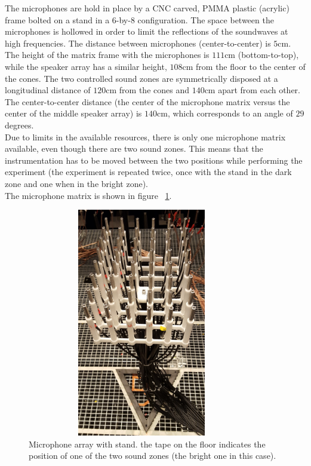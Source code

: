 The microphones are hold in place by a CNC carved, PMMA plastic (acrylic) frame bolted on a stand in a 6-by-8 configuration. The space between the microphones is hollowed in order to limit the reflections of the soundwaves at high frequencies. The distance between microphones (center-to-center) is $5$cm. The height of the matrix frame with the microphones is $111$cm (bottom-to-top), while the speaker array has a similar height, $108$cm from the floor to the center of the cones. The two controlled sound zones are symmetrically disposed at a longitudinal distance of $120$cm from the cones and $140$cm apart from each other. The center-to-center distance (the center of the microphone matrix versus the center of the middle speaker array) is $140$cm, which corresponds to an angle of \tld$29$ degrees.
\\
Due to limits in the available resources, there is only one microphone matrix available, even though there are two sound zones. This means that the instrumentation has to be moved between the two positions while performing the experiment (the experiment is repeated twice, once with the stand in the dark zone and one when in the bright zone).
\\
The microphone matrix is shown in figure ~\ref{fig:mics}.

\begin{figure}[H]
\centering
\includegraphics[width=10cm,height=10cm,keepaspectratio]{Figures/mics}
\decoRule
\caption[Microphone array with stand]{Microphone array with stand. the tape on the floor indicates the position of one of the two sound zones (the bright one in this case).}
\label{fig:mics}
\end{figure}

